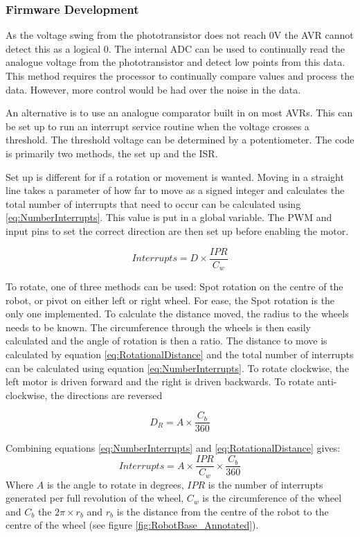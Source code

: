 \subsubsection{Firmware Development}

As the voltage swing from the phototransistor does not reach 0V the AVR cannot detect this as a logical 0. The internal ADC can be used to continually read the analogue voltage from the phototransistor and detect low points from this data. This method requires the processor to continually compare values and process the data. However, more control would be had over the noise in the data.

An alternative is to use an analogue comparator built in on most AVRs. This can be set up to run an interrupt service routine when the voltage crosses a threshold. The threshold voltage can be determined by a potentiometer. The code is primarily two methods, the set up and the ISR.

Set up is different for if a rotation or movement is wanted. Moving in a straight line takes a parameter of how far to move as a signed integer and calculates the total number of interrupts that need to occur can be calculated using \eqref{eq:NumberInterrupts}. This value is put in a global variable. The PWM and input pins to set the correct direction are then set up before enabling the motor. 

\begin{equation}
\label{eq:NumberInterrupts}
Interrupts = D \times \frac{IPR}{C_w}
\end{equation}

To rotate, one of three methods can be used: Spot rotation on the centre of the robot, or pivot on either left or right wheel. For ease, the Spot rotation is the only one implemented. To calculate the distance moved, the radius to the wheels needs to be known. The circumference through the wheels is then easily calculated and the angle of rotation is then a ratio. The distance to move is calculated by equation \eqref{eq:RotationalDistance} and the total number of interrupts can be calculated using equation \eqref{eq:NumberInterrupts}. To rotate clockwise, the left motor is driven forward and the right is driven backwards. To rotate anti-clockwise, the directions are reversed

\begin{equation}
\label{eq:RotationalDistance}
D_{R} = A \times \frac{C_b}{360}
\end{equation}

Combining equations \eqref{eq:NumberInterrupts} and \eqref{eq:RotationalDistance} gives:
\begin{equation}
\label{eq:RotationalInterrupts}
Interrupts = A \times \frac{IPR}{C_w} \times \frac{C_b}{360}
\end{equation}
Where $A$ is the angle to rotate in degrees, $IPR$ is the number of interrupts generated per full revolution of the wheel, $C_w$ is the circumference of the wheel and $C_b$ the $2\pi\times r_b$ and $r_b$ is the distance from the centre of the robot to the centre of the wheel (see figure \ref{fig:RobotBase_Annotated}).



